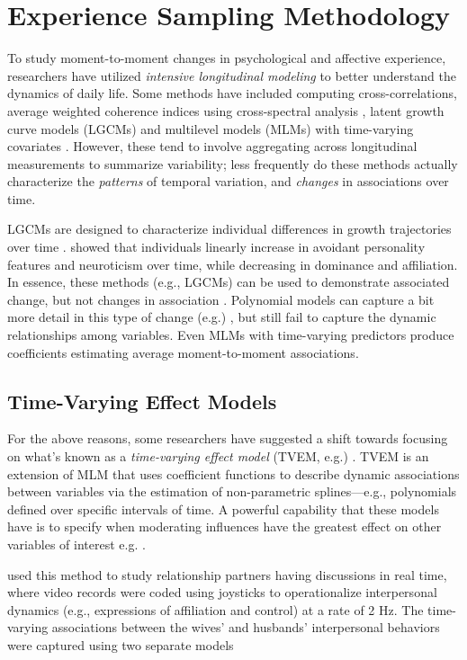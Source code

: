 \section{Experience Sampling Methodology}
To study moment-to-moment changes in psychological and affective experience, researchers have utilized \textit{intensive longitudinal modeling} to better understand the dynamics of daily life. Some methods have included computing cross-correlations, average weighted coherence indices using cross-spectral analysis \cite{sadler2009we}, latent growth curve models (LGCMs) and multilevel models (MLMs) with time-varying covariates \cite{dermody2017modeling}. However, these tend to involve aggregating across longitudinal measurements to summarize variability; less frequently do these methods actually characterize the \textit{patterns} of temporal variation, and \textit{changes} in associations over time. 

LGCMs are designed to characterize individual differences in growth trajectories over time \cite{bollen2006lgcms}. \cite{wright2013parallel} showed that individuals linearly increase in avoidant personality features and neuroticism over time, while decreasing in dominance and affiliation. In essence, these methods (e.g., LGCMs) can be used to demonstrate associated change, but not changes in association \cite{dermody2017modeling}. Polynomial models can capture a bit more detail in this type of change (e.g.) \cite{wright2015daily}, but still fail to capture the dynamic relationships among variables. Even MLMs with time-varying predictors produce coefficients estimating average moment-to-moment associations. 

\subsection{Time-Varying Effect Models}
For the above reasons, some researchers have suggested a shift towards focusing on what's known as a \textit{time-varying effect model} (TVEM, e.g.) \cite{dermody2017modeling,tan2012time}. TVEM is an extension of MLM that uses coefficient functions to describe dynamic associations between variables via the estimation of non-parametric splines---e.g., polynomials defined over specific intervals of time. A powerful capability that these models have is to specify when moderating influences have the greatest effect on other variables of interest e.g. \cite{wright2014treating,shiyko2012using}.

\cite{dermody2017modeling} used this method to study relationship partners having discussions in real time, where video records were coded using joysticks to operationalize interpersonal dynamics (e.g., expressions of affiliation and control) at a rate of 2 Hz. The time-varying associations between the wives' and husbands' interpersonal behaviors were captured using two separate models

